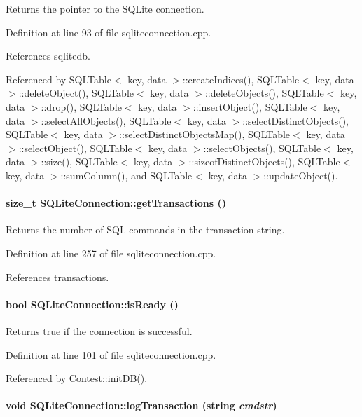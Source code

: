 Returns the pointer to the SQLite connection. 

Definition at line 93 of file sqliteconnection.cpp.

References sqlitedb.

Referenced by SQLTable$<$ key, data $>$::create\-Indices(), SQLTable$<$ key, data $>$::delete\-Object(), SQLTable$<$ key, data $>$::delete\-Objects(), SQLTable$<$ key, data $>$::drop(), SQLTable$<$ key, data $>$::insert\-Object(), SQLTable$<$ key, data $>$::select\-All\-Objects(), SQLTable$<$ key, data $>$::select\-Distinct\-Objects(), SQLTable$<$ key, data $>$::select\-Distinct\-Objects\-Map(), SQLTable$<$ key, data $>$::select\-Object(), SQLTable$<$ key, data $>$::select\-Objects(), SQLTable$<$ key, data $>$::size(), SQLTable$<$ key, data $>$::sizeof\-Distinct\-Objects(), SQLTable$<$ key, data $>$::sum\-Column(), and SQLTable$<$ key, data $>$::update\-Object().\hypertarget{classSQLiteConnection_SQLiteConnectiona14}{
\paragraph[getTransactions]{\setlength{\rightskip}{0pt plus 5cm}size\_\-t SQLite\-Connection::get\-Transactions ()}\hfill}
\label{classSQLiteConnection_SQLiteConnectiona14}


Returns the number of SQL commands in the transaction string. 

Definition at line 257 of file sqliteconnection.cpp.

References transactions.\hypertarget{classSQLiteConnection_SQLiteConnectiona4}{
\paragraph[isReady]{\setlength{\rightskip}{0pt plus 5cm}bool SQLite\-Connection::is\-Ready ()}\hfill}
\label{classSQLiteConnection_SQLiteConnectiona4}


Returns true if the connection is successful. 

Definition at line 101 of file sqliteconnection.cpp.

Referenced by Contest::init\-DB().\hypertarget{classSQLiteConnection_SQLiteConnectiona11}{
\paragraph[logTransaction]{\setlength{\rightskip}{0pt plus 5cm}void SQLite\-Connection::log\-Transaction (string {\em cmdstr})}\hfill}
\label{classSQLiteConnection_SQLiteConnectiona11}


